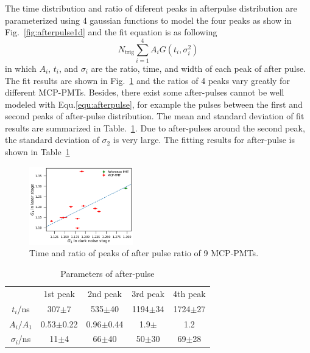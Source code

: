 The time distribution and ratio of diferent peaks in afterpulse distribution are parameterized using 4 gaussian functions to model the four peaks as show in Fig.~\ref{fig:afterpulse1d} and the fit equation is as following
\begin{equation}
    \label{equ:afterpulse}
    N_{\mathrm{trig}}\sum_{i=1}^{4}{A_iG(t_i,\sigma_i^2)}
\end{equation}
in which $A_i$, $t_i$, and $\sigma_i$ are the ratio, time, and width of each peak of after pulse. The fit results are shown in Fig.~\ref{fig:afterpulsePeak} and the ratios of 4 peaks vary greatly for different MCP-PMTs. Besides, there exist some after-pulses cannot be well modeled with Equ.\eqref{equ:afterpulse}, for example the pulses between the first and second peaks of after-pulse distribution. The mean and standard deviation of fit results are summarized in Table.~\ref{tab:afterpulse}. Due to after-pulses around the second peak, the standard deviation of $\sigma_2$ is very large. The fitting results for after-pulse is shown in Table~\ref{tab:afterpulse}
\begin{figure}[!htbp]
    \centering
    \includegraphics[width=0.4\textwidth,page=13]{figures/result/compare.pdf}
    \caption{Time and ratio of peaks of after pulse ratio of 9 MCP-PMTs.}
    \label{fig:afterpulsePeak}
\end{figure}
\begin{table}
    \centering
    \caption{Parameters of after-pulse}
    \label{tab:afterpulse}
    \begin{tabular}{c|c|c|c|c}
        \hline
        &1st peak&2nd peak&3rd peak&4th peak\\
        $t_i$/ns&307$\pm$7&535$\pm$40&1194$\pm$34&1724$\pm$27\\
        $A_i/A_1$&0.53$\pm$0.22&0.96$\pm$0.44&1.9$\pm$&1.2\\
        $\sigma_i$/ns&11$\pm$4&66$\pm$40&50$\pm$30&69$\pm$28\\
        \hline
    \end{tabular}
\end{table}
